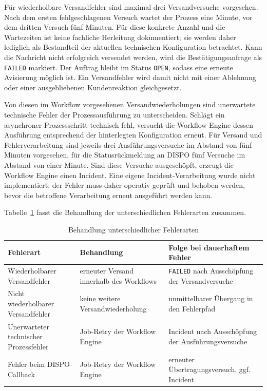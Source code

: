 Für wiederholbare Versandfehler sind maximal drei Versandversuche vorgesehen.
Nach dem ersten fehlgeschlagenen Versuch wartet der Prozess eine Minute, vor
dem dritten Versuch fünf Minuten. Für diese konkrete Anzahl und die Wartezeiten
ist keine fachliche Herleitung dokumentiert; sie werden daher lediglich als
Bestandteil der aktuellen technischen Konfiguration betrachtet. Kann die
Nachricht nicht erfolgreich versendet werden, wird die
Bestätigungsanfrage als \texttt{FAILED} markiert. Der Auftrag bleibt im
Status \texttt{OPEN}, sodass eine erneute Avisierung möglich ist. Ein
Versandfehler wird damit nicht mit einer Ablehnung oder einer ausgebliebenen
Kundenreaktion gleichgesetzt.

Von diesen im Workflow vorgesehenen Versandwiederholungen sind unerwartete
technische Fehler der Prozessausführung zu unterscheiden. Schlägt ein
asynchroner Prozessschritt technisch fehl, versucht die Workflow Engine dessen
Ausführung entsprechend der hinterlegten Konfiguration erneut. Für Versand und
Fehlerverarbeitung sind jeweils drei Ausführungsversuche im Abstand von fünf
Minuten vorgesehen, für die Statusrückmeldung an DISPO fünf Versuche im Abstand
von einer Minute. Sind diese Versuche ausgeschöpft, erzeugt die Workflow Engine
einen Incident. Eine eigene Incident-Verarbeitung wurde nicht implementiert; der
Fehler muss daher operativ geprüft und behoben werden, bevor die betroffene
Verarbeitung erneut ausgeführt werden kann.

Tabelle~\ref{tab:fehlerbehandlung} fasst die Behandlung der unterschiedlichen
Fehlerarten zusammen.

\begin{table}[htbp]
  \centering
  \caption{Behandlung unterschiedlicher Fehlerarten}
  \label{tab:fehlerbehandlung}
  \small
  \setlength{\tabcolsep}{5pt}
  \begin{tabularx}{\textwidth}{
      @{}
      >{\raggedright\arraybackslash}p{}
      >{\raggedright\arraybackslash}p{}
      >{\raggedright\arraybackslash}X
      @{}
    }
    \toprule
    Fehlerart
      & Behandlung
      & Folge bei dauerhaftem Fehler \\
    \midrule
    Wiederholbarer Versandfehler
      & erneuter Versand innerhalb des Workflows
      & \texttt{FAILED} nach Ausschöpfung der Versandversuche \\
    Nicht wiederholbarer Versandfehler
      & keine weitere Versandwiederholung
      & unmittelbarer Übergang in den Fehlerpfad \\
    Unerwarteter technischer Prozessfehler
      & Job-Retry der Workflow Engine
      & Incident nach Ausschöpfung der Ausführungsversuche \\
    Fehler beim DISPO-Callback
      & Job-Retry der Workflow Engine
      & erneuter Übertragungsversuch, ggf. Incident \\
    \bottomrule
  \end{tabularx}
\end{table}


